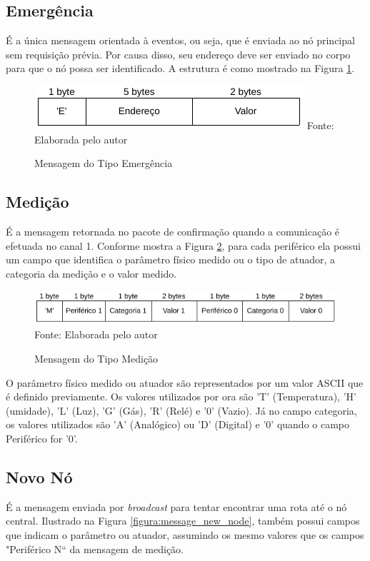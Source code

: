 {\subsection{Emergência}
É a única mensagem orientada à eventos, ou seja, que é enviada ao nó principal sem requisição prévia. Por
causa disso, seu endereço deve ser enviado no corpo para que o nó possa ser identificado. A estrutura é como
mostrado na Figura \ref{figura:message_emergency}.

\begin{figure}[h!]
	\caption{Mensagem do Tipo Emergência}
	\centering
	\includegraphics[scale=0.5]{../images/mensagem_emergencia.png}
	\hspace{\linewidth}
	Fonte: Elaborada pelo autor
	\label{figura:message_emergency}
\end{figure}

\subsection{Medição}
É a mensagem retornada no pacote de confirmação quando a comunicação é efetuada no canal 1. Conforme mostra
a Figura \ref{figura:message_measurement}, para cada periférico ela possui um campo que identifica o parâmetro
físico medido ou o tipo de atuador, a categoria da medição e o valor medido.

\begin{figure}[h!]
	\caption{Mensagem do Tipo Medição}
	\centering
	\includegraphics[scale=0.5]{../images/mensagem_medida.png}
	\hspace{\linewidth}
	Fonte: Elaborada pelo autor
	\label{figura:message_measurement}
\end{figure}

O parâmetro físico medido ou atuador são representados por um valor ASCII que é definido previamente. Os valores utilizados
por ora são 'T' (Temperatura), 'H' (umidade), 'L' (Luz), 'G' (Gás), 'R' (Relé) e '0' (Vazio). Já no campo categoria, os
valores utilizados são 'A' (Analógico) ou 'D' (Digital) e '0' quando o campo Periférico for '0'.

\subsection{Novo Nó}
É a mensagem enviada por \textit{broadcast} para tentar encontrar uma rota até o nó central. Ilustrado na
Figura \ref{figura:message_new_node}, também possui campos que indicam o parâmetro ou atuador, assumindo os
mesmo valores que os campos "Periférico N`` da mensagem de medição.

}
